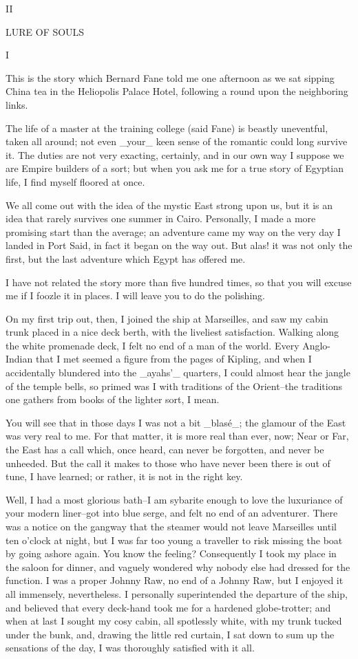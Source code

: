 II

LURE OF SOULS


I

This is the story which Bernard Fane told me one afternoon as we sat
sipping China tea in the Heliopolis Palace Hotel, following a round
upon the neighboring links.

The life of a master at the training college (said Fane) is beastly
uneventful, taken all around; not even _your_ keen sense of the
romantic could long survive it. The duties are not very exacting,
certainly, and in our own way I suppose we are Empire builders of a
sort; but when you ask me for a true story of Egyptian life, I find
myself floored at once.

We all come out with the idea of the mystic East strong upon us, but
it is an idea that rarely survives one summer in Cairo. Personally, I
made a more promising start than the average; an adventure came my way
on the very day I landed in Port Said, in fact it began on the way
out. But alas! it was not only the first, but the last adventure which
Egypt has offered me.

I have not related the story more than five hundred times, so that you
will excuse me if I foozle it in places. I will leave you to do the
polishing.

On my first trip out, then, I joined the ship at Marseilles, and saw
my cabin trunk placed in a nice deck berth, with the liveliest
satisfaction. Walking along the white promenade deck, I felt no end of
a man of the world. Every Anglo-Indian that I met seemed a figure from
the pages of Kipling, and when I accidentally blundered into the
_ayahs'_ quarters, I could almost hear the jangle of the temple bells,
so primed was I with traditions of the Orient--the traditions one
gathers from books of the lighter sort, I mean.

You will see that in those days I was not a bit _blasé_; the glamour
of the East was very real to me. For that matter, it is more real than
ever, now; Near or Far, the East has a call which, once heard, can
never be forgotten, and never be unheeded. But the call it makes to
those who have never been there is out of tune, I have learned; or
rather, it is not in the right key.

Well, I had a most glorious bath--I am sybarite enough to love the
luxuriance of your modern liner--got into blue serge, and felt no end
of an adventurer. There was a notice on the gangway that the steamer
would not leave Marseilles until ten o'clock at night, but I was far
too young a traveller to risk missing the boat by going ashore again.
You know the feeling? Consequently I took my place in the saloon for
dinner, and vaguely wondered why nobody else had dressed for the
function. I was a proper Johnny Raw, no end of a Johnny Raw, but I
enjoyed it all immensely, nevertheless. I personally superintended the
departure of the ship, and believed that every deck-hand took me for a
hardened globe-trotter; and when at last I sought my cosy cabin, all
spotlessly white, with my trunk tucked under the bunk, and, drawing
the little red curtain, I sat down to sum up the sensations of the
day, I was thoroughly satisfied with it all.

